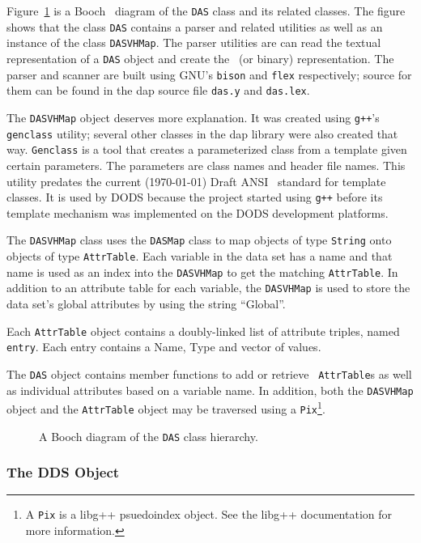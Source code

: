 Figure~\ref{fig:das-class-diagram} is a Booch~\cite{booch:oo-analysis}
diagram of the {\tt DAS} class and its related classes. The figure shows that
the class {\tt DAS} contains a parser and related utilities as well as an
instance of the class {\tt DASVHMap}. The parser utilities are can read the
textual representation of a {\tt DAS} object and create the \Cpp\ (or binary)
representation. The parser and scanner are built using GNU's {\tt bison} and
{\tt flex} respectively; source for them can be found in the dap source file
{\tt das.y} and {\tt das.lex}.

The {\tt DASVHMap} object deserves more explanation. It was created using
{\tt g++}'s {\tt genclass} utility; several other classes in the dap library
were also created that way. {\tt Genclass} is a tool that creates a
parameterized class from a template given certain parameters. The parameters
are class names and header file names. This utility predates the current
(\today) Draft ANSI \Cpp\ standard for template classes. It is used by DODS
because the project started using {\tt g++} before its template mechanism was
implemented on the DODS development platforms.

The {\tt DASVHMap} class uses the {\tt DASMap} class to map objects of type
{\tt String} onto objects of type {\tt AttrTable}. Each variable in the data
set has a name and that name is used as an index into the {\tt DASVHMap} to
get the matching {\tt AttrTable}. In addition to an attribute table for each
variable, the {\tt DASVHMap} is used to store the data set's global
attributes by using the string ``Global''.

Each {\tt AttrTable} object contains a doubly-linked list of attribute
triples, named {\tt entry}. Each entry contains a Name, Type and vector of
values.

The {\tt DAS} object contains member functions to add or retrieve {\tt
  AttrTable}s as well as individual attributes based on a variable name. In
addition, both the {\tt DASVHMap} object and the {\tt AttrTable} object may
be traversed using a {\tt Pix}\footnote{A {\tt Pix} is a libg++ psuedoindex
  object. See the libg++ documentation for more information.}.

\begin{figure}
\centerline{}
\caption{A Booch diagram of the {\tt DAS} class hierarchy.} 
\label{fig:das-class-diagram} 
\end{figure}

\subsubsection{The DDS Object}
\label{toolkits:dds}

